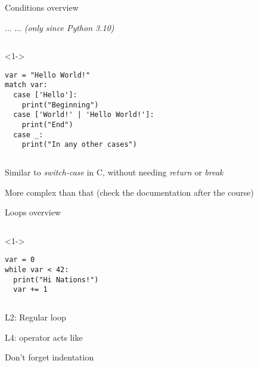 \begin{frame}[fragile]{Conditions overview}

   ...  ...  \hspace{3cm}  \textit{(only since Python 3.10)}

  \begin{columns}[onlytextwidth]
    \begin{column}{\textwidth}
      \begin{onlyenv}<1->
        \begin{lstlisting}[style=python]
var = "Hello World!"
match var:
  case ['Hello']:
    print("Beginning")
  case ['World!' | 'Hello World!']:
    print("End")
  case _:
    print("In any other cases") \end{lstlisting}
      \end{onlyenv}
    \end{column}
  \end{columns}

   Similar to \textit{switch-case} in C, without needing \textit{return} or \textit{break}

   More complex than that (check the documentation after the course)

\end{frame}



\begin{frame}[fragile]{Loops overview}


  \begin{columns}[onlytextwidth]
    \begin{column}{\textwidth}
      \begin{onlyenv}<1->
        \begin{lstlisting}[style=python]
var = 0
while var < 42:
  print("Hi Nations!")
  var += 1 \end{lstlisting}
      \end{onlyenv}
    \end{column}
  \end{columns}

   L2: Regular  loop

   L4: \TTBF{+=} operator acts like 

   Don't forget indentation

\end{frame}


